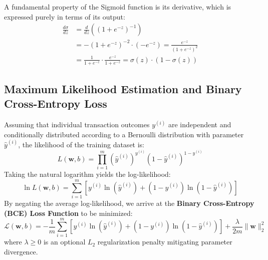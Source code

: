 \documentclass[11pt,a4paper]{article}
\begin{document}
A fundamental property of the Sigmoid function is its derivative, which is expressed purely in terms of its output:
\begin{align}
    \frac{d\sigma}{dz} &= \frac{d}{dz} \left( (1 + e^{-z})^{-1} \right) \nonumber \\
    &= -(1 + e^{-z})^{-2} \cdot (-e^{-z}) = \frac{e^{-z}}{(1 + e^{-z})^2} \nonumber \\
    &= \frac{1}{1 + e^{-z}} \cdot \frac{e^{-z}}{1 + e^{-z}} = \sigma(z) \cdot (1 - \sigma(z))
    \label{eq:sigmoid_deriv}
\end{align}

\subsection{Maximum Likelihood Estimation and Binary Cross-Entropy Loss}
Assuming that individual transaction outcomes $y^{(i)}$ are independent and conditionally distributed according to a Bernoulli distribution with parameter $\hat{y}^{(i)}$, the likelihood of the training dataset is:
\begin{equation}
    L(\mathbf{w}, b) = \prod_{i=1}^m (\hat{y}^{(i)})^{y^{(i)}} (1 - \hat{y}^{(i)})^{1 - y^{(i)}}
\end{equation}
Taking the natural logarithm yields the log-likelihood:
\begin{equation}
    \ln L(\mathbf{w}, b) = \sum_{i=1}^m \left[ y^{(i)} \ln(\hat{y}^{(i)}) + (1 - y^{(i)}) \ln(1 - \hat{y}^{(i)}) \right]
\end{equation}
By negating the average log-likelihood, we arrive at the \textbf{Binary Cross-Entropy (BCE) Loss Function} to be minimized:
\begin{equation}
    \mathcal{L}(\mathbf{w}, b) = -\frac{1}{m} \sum_{i=1}^m \left[ y^{(i)} \ln(\hat{y}^{(i)}) + (1 - y^{(i)}) \ln(1 - \hat{y}^{(i)}) \right] + \frac{\lambda}{2m} \|\mathbf{w}\|_2^2
    \label{eq:bce_loss}
\end{equation}
where $\lambda \ge 0$ is an optional $L_2$ regularization penalty mitigating parameter divergence.
\end{document}

